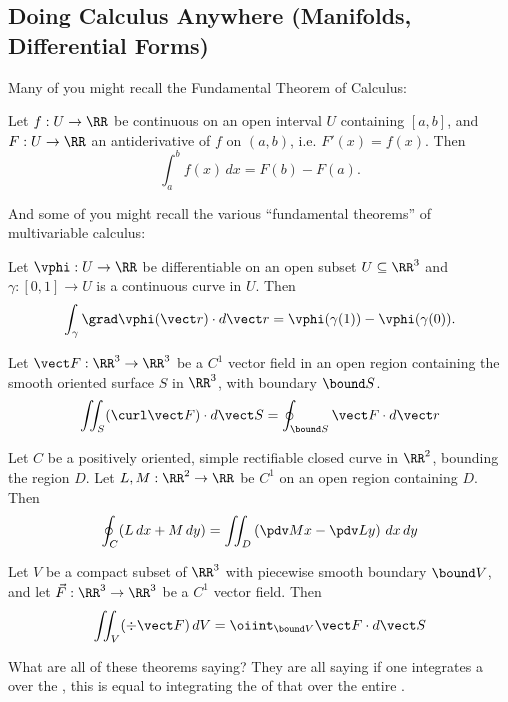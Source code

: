 \documentclass[12pt]{article}
\begin{document}
\subsection{Doing Calculus Anywhere (Manifolds, Differential Forms)}
Many of you might recall the Fundamental Theorem of Calculus: 
\begin{theorem*}
  Let $f : U \to \RR$ be continuous on an open interval $U$ containing $[a, b]$,
  and $F : U \to \RR$ an antiderivative of $f$ on $(a, b)$, i.e. $F'(x) = f(x)$.
  Then \[
   \int_a^b f(x) \, dx = F(b) - F(a).
  \]  
\end{theorem*}
\noindent And some of you might recall the various ``fundamental theorems'' of
multivariable calculus:
\begin{center}
  \begin{minipage}{0.47\textwidth}
    \begin{theorem*}
   Let $\vphi : U \to \RR$ be differentiable on an open subset $U \subseteq
   \RR^3$ and $\gamma : [0,1] \to U$ is a continuous curve in $U$.
   Then
   \[
    \int_\gamma \grad \vphi(\vect r) \cdot d\vect r = \vphi(\gamma(1)) -
    \vphi(\gamma(0)).
   \] 
  \end{theorem*} 
  \begin{theorem*}
    Let $\vect F : \RR^3 \to \RR^3$ be a $C^1$ vector field in an open region
    containing the smooth oriented surface $S$ in $\RR^3$, with boundary $\bound
    S$. 
    \[
      \iint_S (\curl \vect F) \cdot d\vect S = \oint_{\bound S} \vect F \cdot
      d\vect r
    \] 
  \end{theorem*}
  \end{minipage}
  \begin{minipage}{0.47\textwidth}
    \begin{theorem*}
     Let $C$ be a positively oriented, simple rectifiable closed curve in
     $\RR^2$, bounding the region $D$. Let $L, M : \RR^2 \to \RR$ be $C^1$ on an
     open region containing $D$. Then
     \[
      \oint_C (L \, dx + M \, dy) = \iint_D \left( \pdv M x - \pdv L y \right)
      \, dx \, dy
     \] 
   \end{theorem*}
   \begin{theorem*}
     Let $V$ be a compact subset of $\RR^3$ with piecewise smooth boundary
     $\bound V$, and let $\vec F : \RR^3 \to \RR^3$ be a $C^1$ vector field. 
     Then
     \[
      \iint_V (\div \vect F) \, d V = \oiint_{\bound V} \vect F \cdot d \vect S
     \] 
   \end{theorem*}
  \end{minipage}
\end{center}
What are all of these theorems saying? They are all saying if one integrates a 
 over the , this is equal to 
integrating the  of that  over the entire . 
\end{document}
